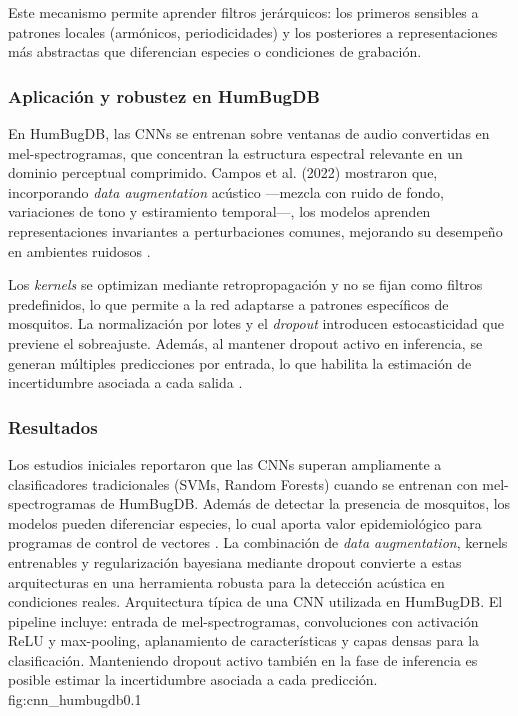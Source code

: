 Este mecanismo permite aprender filtros jerárquicos: los primeros sensibles a patrones locales (armónicos, periodicidades) y los posteriores a representaciones más abstractas que diferencian especies o condiciones de grabación.

\subsubsection{Aplicación y robustez en HumBugDB}

En HumBugDB, las CNNs se entrenan sobre ventanas de audio convertidas en mel-spectrogramas, que concentran la estructura espectral relevante en un dominio perceptual comprimido.  
Campos et al. (2022) mostraron que, incorporando \emph{data augmentation} acústico —mezcla con ruido de fondo, variaciones de tono y estiramiento temporal—, los modelos aprenden representaciones invariantes a perturbaciones comunes, mejorando su desempeño en ambientes ruidosos \cite{Campos2022}.  

Los \emph{kernels} se optimizan mediante retropropagación y no se fijan como filtros predefinidos, lo que permite a la red adaptarse a patrones específicos de mosquitos.  
La normalización por lotes y el \emph{dropout} introducen estocasticidad que previene el sobreajuste.  
Además, al mantener dropout activo en inferencia, se generan múltiples predicciones por entrada, lo que habilita la estimación de incertidumbre asociada a cada salida \cite{GalGhahramani2016}.  

\subsubsection{Resultados}

Los estudios iniciales reportaron que las CNNs superan ampliamente a clasificadores tradicionales (SVMs, Random Forests) cuando se entrenan con mel-spectrogramas de HumBugDB.  
Además de detectar la presencia de mosquitos, los modelos pueden diferenciar especies, lo cual aporta valor epidemiológico para programas de control de vectores \cite{HumBugDB, Campos2022}.  
La combinación de \emph{data augmentation}, kernels entrenables y regularización bayesiana mediante dropout convierte a estas arquitecturas en una herramienta robusta para la detección acústica en condiciones reales.
{Arquitectura típica de una CNN utilizada en HumBugDB. 
	El pipeline incluye: entrada de mel-spectrogramas, convoluciones con activación ReLU y max-pooling, 
	aplanamiento de características y capas densas para la clasificación. 
	Manteniendo dropout activo también en la fase de inferencia es posible estimar la incertidumbre asociada a cada predicción.}
{fig:cnn_humbugdb}{0.1}


